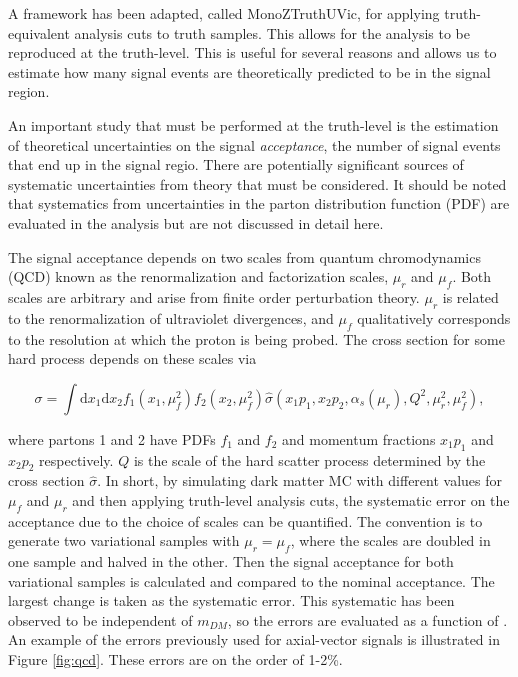 A framework has been adapted, called MonoZTruthUVic, for applying truth-equivalent analysis cuts to truth samples. This allows for the analysis to be reproduced at the truth-level. This is useful for several reasons and allows us to estimate how many signal events are theoretically predicted to be in the signal region.

An important study that must be performed at the truth-level is the estimation of theoretical uncertainties on the signal \textit{acceptance}, the number of signal events that end up in the signal regio. There are potentially significant sources of systematic uncertainties from theory that must be considered. It should be noted that systematics from uncertainties in the parton distribution function (PDF) are evaluated in the analysis but are not discussed in detail here. 

The signal acceptance depends on two scales from quantum chromodynamics (QCD) known as the renormalization and factorization scales, $\mu_r$ and $\mu_f$. Both scales are arbitrary and arise from finite order perturbation theory. $\mu_r$ is related to the renormalization of ultraviolet divergences, and $\mu_f$ qualitatively corresponds to the resolution at which the proton is being probed. The cross section for some hard process depends on these scales via

\begin{equation}
\sigma = \int \text{d}x_1 \text{d}x_2 f_1(x_1, \mu_f^2) f_2 (x_2, \mu_f^2) \hat{\sigma}(x_1 p_1, x_2 p_2, \alpha_s(\mu_r), Q^2, \mu_r^2, \mu_f^2),
\end{equation}

\noindent where partons 1 and 2 have PDFs $f_1$ and $f_2$ and momentum fractions $x_1 p_1$ and $x_2 p_2$ respectively. $Q$ is the scale of the hard scatter process determined by the cross section $\hat{\sigma}$.
In short, by simulating dark matter MC with different values for $\mu_f$ and $\mu_r$ and then applying truth-level analysis cuts, the systematic error on the acceptance due to the choice of scales can be quantified. The convention is to generate two variational samples with $\mu_r = \mu_f$, where the scales are doubled in one sample and halved in the other. Then the signal acceptance for both variational samples is calculated and compared to the nominal acceptance. The largest change is taken as the systematic error. This systematic has been observed to be independent of $m_{DM}$, so the errors are evaluated as a function of \mmed. An example of the errors previously used for axial-vector signals is illustrated in Figure \ref{fig:qcd}. These errors are on the order of 1-2\%.

